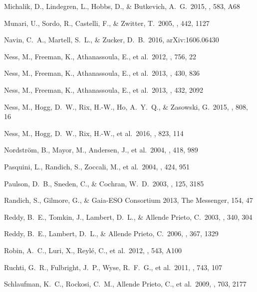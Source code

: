 \documentclass[preprint]{aastex61}
\begin{document}
\begin{thebibliography}{dummy}
 Michalik, D., Lindegren, L., Hobbs, D., \& Butkevich, A.~G.\ 2015, \aap, 583, A68 

 Munari, U., Sordo, R., Castelli, F., \& Zwitter, T.\ 2005, \aap, 442, 1127 

 Navin, C.~A., Martell, S.~L., \& Zucker, D.~B.\ 2016, arXiv:1606.06430 

 Ness, M., Freeman, K., Athanassoula, E., et al.\ 2012, \apj, 756, 22 

 Ness, M., Freeman, K., Athanassoula, E., et al.\ 2013, \mnras, 430, 836 

 Ness, M., Freeman, K., Athanassoula, E., et al.\ 2013, \mnras, 432, 2092 

 Ness, M., Hogg, D.~W., Rix, H.-W., Ho, A.~Y.~Q., \& Zasowski, G.\ 2015, \apj, 808, 16 

 Ness, M., Hogg, D.~W., Rix, H.-W., et al.\ 2016, \apj, 823, 114 

 Nordstr{\"o}m, B., Mayor, M., Andersen, J., et al.\ 2004, \aap, 418, 989 

 Pasquini, L., Randich, S., Zoccali, M., et al.\ 2004, \aap, 424, 951 

 Paulson, D.~B., Sneden, C., \& Cochran, W.~D.\ 2003, \aj, 125, 3185 

 Randich, S., Gilmore, G., \& Gaia-ESO Consortium 2013, The Messenger, 154, 47 

 Reddy, B.~E., Tomkin, J., Lambert, D.~L., \& Allende Prieto, C.\ 2003, \mnras, 340, 304 

 Reddy, B.~E., Lambert, D.~L., \& Allende Prieto, C.\ 2006, \mnras, 367, 1329 

 Robin, A.~C., Luri, X., Reyl{\'e}, C., et al.\ 2012, \aap, 543, A100 

 Ruchti, G.~R., Fulbright, J.~P., Wyse, R.~F.~G., et al.\ 2011, \apj, 743, 107 

 Schlaufman, K.~C., Rockosi, C.~M., Allende Prieto, C., et al.\ 2009, \apj, 703, 2177 


\end{thebibliography}
\end{document}
